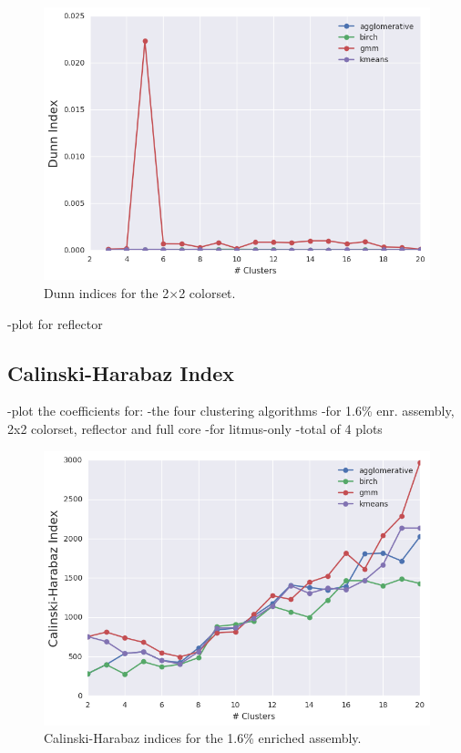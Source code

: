 \clearpage

\begin{figure}[h!]
\centering
\includegraphics[width=0.87\linewidth]{figures/results/model-select/2x2/dunn-combined-U238-capture-1}
\vspace{2mm}
\caption[Dunn indices for the 2$\times$2 colorset]{Dunn indices for the 2$\times$2 colorset.}
\label{fig:chap11-2x2-dunn-index}
\end{figure}

\clearpage

-plot for reflector

\subsection{Calinski-Harabaz Index}
\label{subsec:chap11-ch-index}

-plot the coefficients for:
  -the four clustering algorithms
  -for 1.6\% enr. assembly, 2x2 colorset, reflector and full core
  -for litmus-only
  -total of 4 plots

\clearpage

\begin{figure}[h!]
\centering
\includegraphics[width=0.87\linewidth]{figures/results/model-select/assm-16/ch-combined-U238-capture-1}
\vspace{2mm}
\caption[Calinski-Harabaz indices for the 1.6\% enriched assembly]{Calinski-Harabaz indices for the 1.6\% enriched assembly.}
\label{fig:chap11-assm-16-ch-index}
\end{figure}

